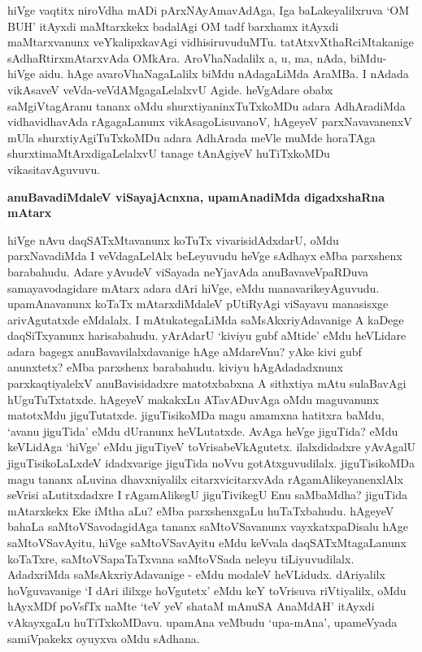 hiVge vaqtitx niroVdha mADi pArxNAyAmavAdAga, Iga baLakeyalilxruva `OM BUH' itAyxdi maMtarxkekx badalAgi OM tadf barxhamx itAyxdi maMtarxvanunx veYkalipxkavAgi vidhisiruvuduMTu. tatAtxvXthaRciMtakanige sAdhaRtirxmAtarxvAda OMkAra. AroVhaNadalilx a, u, ma, nAda, biMdu- hiVge aidu. hAge avaroVhaNagaLalilx biMdu nAdagaLiMda AraMBa. I nAdada vikAsaveV veVda-veVdAMgagaLelalxvU Agide. heVgAdare obabx saMgiVtagAranu tananx oMdu shurxtiyaninxTuTxkoMDu adara AdhAradiMda vidhavidhavAda rAgagaLanunx vikAsagoLisuvanoV, hAgeyeV parxNavavanenxV mUla shurxtiyAgiTuTxkoMDu adara AdhArada meVle muMde horaTAga shurxtimaMtArxdigaLelalxvU tanage tAnAgiyeV huTiTxkoMDu vikasitavAguvuvu.

\noindent
{\bf\large{anuBavadiMdaleV viSayajAcnxna, upamAnadiMda digadxshaRna mAtarx}}\label{page166}

hiVge nAvu daqSATxMtavanunx koTuTx vivarisidAdxdarU, oMdu parxNavadiMda I veVdagaLelAlx beLeyuvudu heVge sAdhayx eMba parxshenx barabahudu. Adare yAvudeV viSayada neYjavAda anuBavaveVpaRDuva samayavodagidare mAtarx adara dAri hiVge, eMdu manavarikeyAguvudu. upamAnavanunx koTaTx mAtarxdiMdaleV pUtiRyAgi viSayavu manasisxge arivAgutatxde eMdalalx. I mAtukategaLiMda saMsAkxriyAdavanige A kaDege daqSiTxyanunx harisabahudu. yArAdarU `kiviyu gubf aMtide' eMdu heVLidare adara bagegx anuBavavilalxdavanige hAge aMdareVnu? yAke kivi gubf anunxtetx? eMba parxshenx barabahudu. kiviyu hAgAdadadxnunx parxkaqtiyalelxV anuBavisidadxre matotxbabxna A sithxtiya mAtu sulaBavAgi hUguTuTxtatxde. hAgeyeV makakxLu ATavADuvAga oMdu maguvanunx matotxMdu jiguTutatxde. jiguTisikoMDa magu amamxna hatitxra baMdu, `avanu jiguTida' eMdu dUranunx heVLutatxde. AvAga heVge jiguTida? eMdu keVLidAga `hiVge' eMdu jiguTiyeV toVrisabeVkAgutetx. ilalxdidadxre yAvAgalU jiguTisikoLaLxdeV idadxvarige jiguTida noVvu gotAtxguvudilalx. jiguTisikoMDa magu tananx aLuvina dhavxniyalilx citarxvicitarxvAda rAgamAlikeyanenxlAlx seVrisi aLutitxdadxre I rAgamAlikegU jiguTivikegU Enu saMbaMdha? jiguTida mAtarxkekx Eke iMtha aLu? eMba parxshenxgaLu huTaTxbahudu. hAgeyeV bahaLa saMtoVSavodagidAga tananx saMtoVSavanunx vayxkatxpaDisalu hAge saMtoVSavAyitu, hiVge saMtoVSavAyitu eMdu keVvala daqSATxMtagaLanunx koTaTxre, saMtoVSapaTaTxvana saMtoVSada neleyu tiLiyuvudilalx. AdadxriMda saMsAkxriyAdavanige - eMdu modaleV heVLidudx. dAriyalilx hoVguvavanige `I dAri ililxge hoVgutetx' eMdu keY toVrisuva riVtiyalilx, oMdu hAyxMDf poVsfTx naMte `teV yeV shataM mAnuSA AnaMdAH'\label{166} itAyxdi vAkayxgaLu huTiTxkoMDavu. upamAna veMbudu `upa-mAna', upameVyada samiVpakekx oyuyxva oMdu sAdhana.

